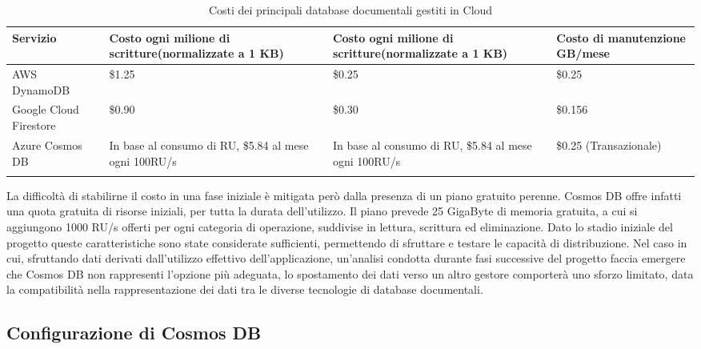 \begin{longtable}{|P{3.2cm}|P{4.2cm}|P{4.2cm}|P{3cm}|}
    \hline
    \textbf{Servizio}      & \textbf{Costo ogni milione di scritture}\newline(normalizzate a 1 KB) & \textbf{Costo ogni milione di scritture}\newline (normalizzate a 1 KB) & \textbf{Costo di manutenzione GB/mese} \\
    \hline
    \endhead
    AWS DynamoDB           & \$1.25                                                                & \$0.25                                                                 & \$0.25                                 \\
    \hline
    Google Cloud Firestore & \$0.90                                                                & \$0.30                                                                 & \$0.156                                \\
    \hline
    Azure Cosmos DB        & In base al consumo di RU, \$5.84 al mese ogni 100RU/s                 & In base al consumo di RU, \$5.84 al mese ogni 100RU/s                  & \$0.25 (Transazionale)                 \\
    \hline
    \caption{Costi dei principali database documentali gestiti in Cloud}
\end{longtable}

La difficoltà di stabilirne il costo in una fase iniziale
è mitigata però dalla presenza di un piano gratuito perenne.
Cosmos DB offre infatti una quota gratuita di risorse iniziali,
per tutta la durata dell'utilizzo.
Il piano prevede 25 GigaByte di memoria gratuita,
a cui si aggiungono 1000 RU/s offerti per ogni categoria di operazione,
suddivise in lettura, scrittura ed eliminazione.
Dato lo stadio iniziale del progetto queste caratteristiche sono state considerate sufficienti,
permettendo di sfruttare e testare le capacità di distribuzione.
Nel caso in cui, sfruttando dati derivati dall'utilizzo effettivo dell'applicazione,
un'analisi condotta durante fasi successive del progetto faccia emergere che
Cosmos DB non rappresenti l'opzione più adeguata,
lo spostamento dei dati verso un altro gestore comporterà uno sforzo limitato,
data la compatibilità nella rappresentazione dei dati tra le diverse tecnologie di database documentali.

\subsection{Configurazione di Cosmos DB}

